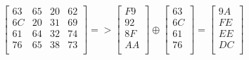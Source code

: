 \[
  \begin{bmatrix}
    63 & 65 & 20 & 62 \\
    6C & 20 & 31 & 69 \\
    61 & 64 & 32 & 74 \\
    76 & 65 & 38 & 73 \\
  \end{bmatrix}
  =>
  \begin{bmatrix}
    F9 \\
    92 \\
    8F \\
    AA \\
  \end{bmatrix}
  \oplus
  \begin{bmatrix}
    63 \\
    6C \\
    61 \\
    76 \\
  \end{bmatrix}
  =
  \begin{bmatrix}
    9A \\
    FE \\
    EE \\
    DC \\
  \end{bmatrix}
\]